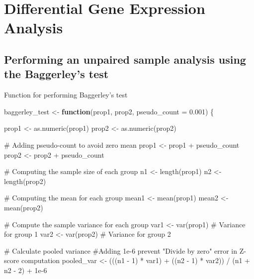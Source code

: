 \documentclass[
  letterpaper,
  DIV=11,
  numbers=noendperiod]{scrartcl}
\newenvironment{Shaded}{\begin{snugshade}}{\end{snugshade}}
\newcommand{\AttributeTok}[1]{\textcolor[rgb]{0.40,0.45,0.13}{#1}}
\newcommand{\CommentTok}[1]{\textcolor[rgb]{0.37,0.37,0.37}{#1}}
\newcommand{\ControlFlowTok}[1]{\textcolor[rgb]{0.00,0.23,0.31}{\textbf{#1}}}
\newcommand{\DecValTok}[1]{\textcolor[rgb]{0.68,0.00,0.00}{#1}}
\newcommand{\FloatTok}[1]{\textcolor[rgb]{0.68,0.00,0.00}{#1}}
\newcommand{\FunctionTok}[1]{\textcolor[rgb]{0.28,0.35,0.67}{#1}}
\newcommand{\NormalTok}[1]{\textcolor[rgb]{0.00,0.23,0.31}{#1}}
\newcommand{\OtherTok}[1]{\textcolor[rgb]{0.00,0.23,0.31}{#1}}
\newcommand{\SpecialCharTok}[1]{\textcolor[rgb]{0.37,0.37,0.37}{#1}}
\begin{document}
\section{Differential Gene Expression
Analysis}\label{differential-gene-expression-analysis}

\subsection{Performing an unpaired sample analysis using the Baggerley's
test}\label{performing-an-unpaired-sample-analysis-using-the-baggerleys-test}

Function for performing Baggerley's test

\begin{Shaded}
\begin{Highlighting}[]
\NormalTok{baggerley\_test }\OtherTok{\textless{}{-}} \ControlFlowTok{function}\NormalTok{(prop1, prop2, }\AttributeTok{pseudo\_count =} \FloatTok{0.001}\NormalTok{) \{}
  
\NormalTok{  prop1 }\OtherTok{\textless{}{-}} \FunctionTok{as.numeric}\NormalTok{(prop1)}
\NormalTok{  prop2 }\OtherTok{\textless{}{-}} \FunctionTok{as.numeric}\NormalTok{(prop2)}
  
  \CommentTok{\# Adding pseudo{-}count to avoid zero mean}
\NormalTok{  prop1 }\OtherTok{\textless{}{-}}\NormalTok{ prop1 }\SpecialCharTok{+}\NormalTok{ pseudo\_count}
\NormalTok{  prop2 }\OtherTok{\textless{}{-}}\NormalTok{ prop2 }\SpecialCharTok{+}\NormalTok{ pseudo\_count}
  
  \CommentTok{\# Computing the sample size of each group}
\NormalTok{  n1 }\OtherTok{\textless{}{-}} \FunctionTok{length}\NormalTok{(prop1)}
\NormalTok{  n2 }\OtherTok{\textless{}{-}} \FunctionTok{length}\NormalTok{(prop2)}
  
  \CommentTok{\# Computing the mean for each group}
\NormalTok{  mean1 }\OtherTok{\textless{}{-}} \FunctionTok{mean}\NormalTok{(prop1)}
\NormalTok{  mean2 }\OtherTok{\textless{}{-}} \FunctionTok{mean}\NormalTok{(prop2)}
  
  \CommentTok{\# Compute the sample variance for each group}
\NormalTok{  var1 }\OtherTok{\textless{}{-}} \FunctionTok{var}\NormalTok{(prop1)  }\CommentTok{\# Variance for group 1}
\NormalTok{  var2 }\OtherTok{\textless{}{-}} \FunctionTok{var}\NormalTok{(prop2)  }\CommentTok{\# Variance for group 2}
  
  \CommentTok{\# Calculate pooled variance}
  \CommentTok{\#Adding 1e{-}6 prevent "Divide by zero" error in Z{-}score computation}
\NormalTok{  pooled\_var }\OtherTok{\textless{}{-}}\NormalTok{ (((n1 }\SpecialCharTok{{-}} \DecValTok{1}\NormalTok{) }\SpecialCharTok{*}\NormalTok{ var1) }\SpecialCharTok{+}\NormalTok{ ((n2 }\SpecialCharTok{{-}} \DecValTok{1}\NormalTok{) }\SpecialCharTok{*}\NormalTok{ var2)) }\SpecialCharTok{/}\NormalTok{ (n1 }\SpecialCharTok{+}\NormalTok{ n2 }\SpecialCharTok{{-}} \DecValTok{2}\NormalTok{) }\SpecialCharTok{+} \FloatTok{1e{-}6} 
  

\end{Highlighting}
\end{Shaded}
\end{document}
